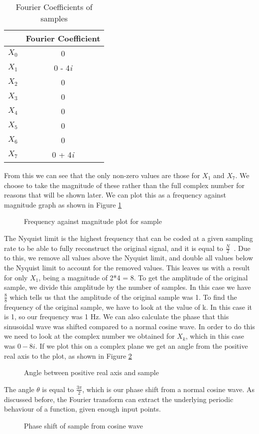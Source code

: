 \begin{table}[!htb]
\centering
\begin{tabular}{ |c|c| } 
\hline
& Fourier Coefficient \\
\hline
$X_0$ & 0 \\ 
$X_1$ & 0 - 4\textit{i} \\ 
$X_2$ & 0 \\ 
$X_3$ & 0 \\ 
$X_4$ & 0 \\ 
$X_5$ & 0 \\ 
$X_6$ & 0 \\ 
$X_7$ & 0 + 4\textit{i} \\ 
\hline
\end{tabular}
\caption{Fourier Coefficients of samples}
\label{table:fourierCoefficient}
\end{table}
From this we can see that the only non-zero values are those for $X_1$ and $X_7$. We choose to take the magnitude of these rather than the full complex number for reasons that will be shown later. We can plot this as a frequency against magnitude graph as shown in Figure \ref{fig:nyquist}
\begin{figure}[!htb]
\centering
\resizebox{10cm}{!}{}
\caption{Frequency against magnitude plot for sample}
\label{fig:nyquist}
\end{figure}
The Nyquist limit is the highest frequency that can be coded at a given sampling rate to be able to fully reconstruct the original signal, and it is equal to $\frac{N}{2}$~\cite{tretter1976introduction}. Due to this, we remove all values above the Nyquist limit, and double all values below the Nyquist limit to account for the removed values. This leaves us with a result for only $X_1$, being a magnitude of 2*4 = 8. To get the amplitude of the original sample, we divide this amplitude by the number of samples. In this case we have $\frac{8}{8}$ which tells us that the amplitude of the original sample was 1. To find the frequency of the original sample, we have to look at the value of k. In this case it is 1, so our frequency was 1 Hz. We can also calculate the phase that this sinusoidal wave was shifted compared to a normal cosine wave. In order to do this we need to look at the complex number we obtained for $X_k$, which in this case was $0-8\textit{i}$. If we plot this on a complex plane we get an angle from the positive real axis to the plot, as shown in Figure \ref{fig:complex}
\begin{figure}[!htb]
\centering
\resizebox{6cm}{!}{}
\caption{Angle between positive real axis and sample}
\label{fig:complex}
\end{figure}
The angle $\theta$ is equal to $\frac{3\pi}{2}$, which is our phase shift from a normal cosine wave. As discussed before, the Fourier transform can extract the underlying periodic behaviour of a function, given enough input points.
\begin{figure}[!htb]
\centering
\resizebox{8cm}{!}{}
\caption{Phase shift of sample from cosine wave}
\label{fig:phase}
\end{figure}
